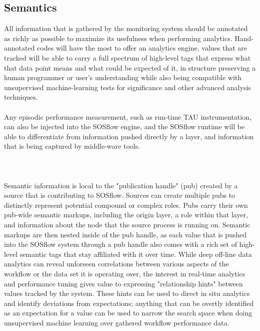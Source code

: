 \subsection{Semantics}
All information that is gathered by the monitoring system should be annotated 
as richly as possible to maximize its usefulness when performing analytics. 
Hand-annotated codes will have the most to offer an analytics engine,  
values that are tracked will be able to carry a full spectrum of high-level 
tags that express what that data point means and what could be expected of it, 
in structure preserving a human programmer or user's understanding while also
being compatible with unsupervised machine-learning tests for significance and 
other advanced analysis techniques.\\
\\
Any episodic performance measurement, such as run-time TAU instrumentation, can 
also be injected into the SOSflow engine, and the SOSflow runtime will be able to 
differentiate from information pushed directly by a layer, and information that 
is being captured by middle-ware tools.\\
\\
\\
\\
Semantic information is local to the "publication handle" (pub) 
created by a source that is contributing to SOSflow.  Sources can create 
multiple pubs to distinctly represent potential compound or complex roles. Pubs 
carry their own pub-wide semantic markups, including 
the origin layer, a role within that layer, and information 
about the node that the source process is running on. Semantic markups are then 
nested inside of the pub handle, as each value that is pushed 
into the SOSflow system through a pub handle also comes with a rich set of 
high-level semantic tags that stay affiliated with it over time. While deep 
off-line data analytics 
can reveal unforseen correlations between various aspects of the workflow or the 
data set it is operating over, the interest in real-time analytics and 
performance tuning gives value to expressing "relationship hints" between 
values tracked by the system. These hints can be used to direct in situ 
analytics and identify deviations from expectations; anything that can be 
overtly identified as an expectation for a value can be used to narrow the 
search space when doing unsupervised machine learning over gathered workflow 
performance data.

